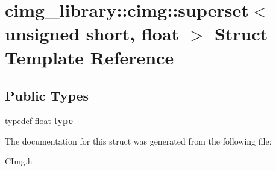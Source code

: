 \hypertarget{structcimg__library_1_1cimg_1_1superset_3_01unsigned_01short_00_01float_01_4}{\section{cimg\-\_\-library\-:\-:cimg\-:\-:superset$<$ unsigned short, float $>$ Struct Template Reference}
\label{structcimg__library_1_1cimg_1_1superset_3_01unsigned_01short_00_01float_01_4}
}
\subsection*{Public Types}
\begin{DoxyCompactItemize}
\item 
\hypertarget{structcimg__library_1_1cimg_1_1superset_3_01unsigned_01short_00_01float_01_4_a5aceaf968af550261b460b3e56cf51b3}{typedef float {\bfseries type}}\label{structcimg__library_1_1cimg_1_1superset_3_01unsigned_01short_00_01float_01_4_a5aceaf968af550261b460b3e56cf51b3}

\end{DoxyCompactItemize}


The documentation for this struct was generated from the following file\-:\begin{DoxyCompactItemize}
\item 
C\-Img.\-h\end{DoxyCompactItemize}
